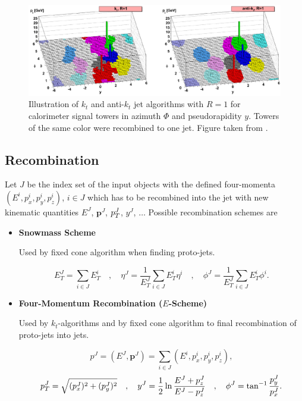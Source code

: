 \begin{figure}[t]
  \centering
  \includegraphics[width=\textwidth]{Chapter2/JetRecombination.png}
  \caption[Illustration of $k_t$ and anti-$k_t$ jet algorithms with $R=1$ for
          calorimeter signal towers in azimuth $\Phi$ and pseudorapidity $y$. Towers of
          the same color were recombined to one jet. ]
          {Illustration of $k_t$ and anti-$k_t$ jet algorithms with $R=1$ for
          calorimeter signal towers in azimuth $\Phi$ and pseudorapidity $y$. Towers of
          the same color were recombined to one jet. Figure taken from
          \cite{JetTheoreticalPictures}.} 
  \label{fig:JetRecombination}
\end{figure}

\subsection{Recombination}
\label{sse:Recombination}

Let $J$ be the index set of the input objects with the defined four-momenta
$(E^i,p_x^i,p_y^i,p_z^i)$, $i \in J$ which has to be recombined into the jet
with new kinematic quantities $E^J$, $\mathbf{p}^J$, $p_{T}^J$, $y^J$, $\ldots$
Possible recombination schemes are

\begin{itemize}
\item \textbf{Snowmass Scheme}

Used by fixed cone algorithm when finding proto-jets.

\begin{equation}
  E_T^J = \sum_{i \in J} E_T^i
  \quad , \quad
  \eta^J = \frac{1}{E_T^J} \sum_{i \in J} E_T^i \eta^i
  \quad , \quad
  \phi^J = \frac{1}{E_T^J} \sum_{i \in J} E_T^i \phi^i.
\end{equation}

\item \textbf{Four-Momentum Recombination ($E$-Scheme)}

Used by $k_t$-algorithms and by fixed cone algorithm to final recombination of
proto-jets into jets.

\begin{equation}
  p^J = ( E^J, \mathbf{p}^J ) = \sum_{i \in J} (E^i,p_x^i,p_y^i,p_z^i),
\end{equation}
\begin{equation}
  p_{T}^J = \sqrt{(p_x^J)^2 + (p_y^J)^2}
  \quad , \quad
  y^J = \frac{1}{2} \ln \frac{E^J + p_z^J}{E^J - p_z^J}
  \quad , \quad
  \phi^J = \tan^{-1} \frac{p_y^J}{p_x^J}.
\end{equation}
\end{itemize}

